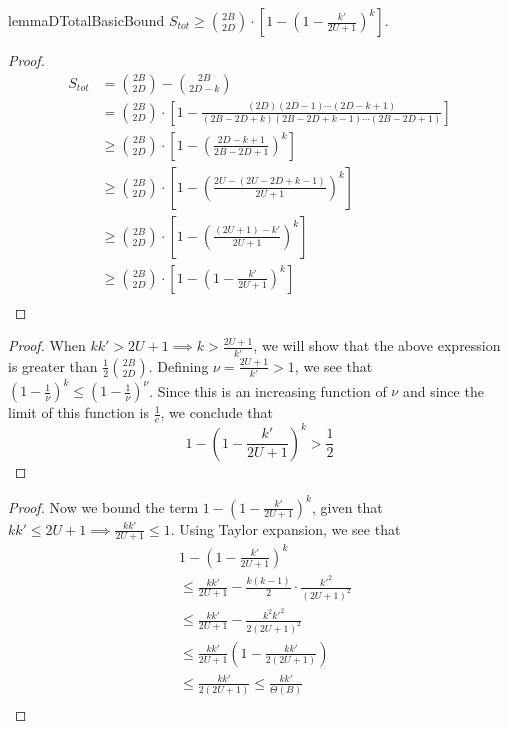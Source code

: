 \begin{restatable}{lemma}{DTotalBasicBound}
\label{lem:DTotalBasicBound}
$S_{tot} \ge {{2B}\choose{2D}}\cdot \left[1-\left(1 - \frac{k'}{2U+1}\right)^k\right]$.
\end{restatable}
\begin{proof}
\begin{align}
S_{tot} &= {{2B}\choose{2D}}-{{2B}\choose{2D-k}}\\
&= {{2B}\choose{2D}}\cdot \left[1-\frac{(2D)(2D-1)\cdots(2D-k+1)}{(2B-2D+k)(2B-2D+k-1)\cdots(2B-2D+1)}\right]\\
&\ge {{2B}\choose{2D}}\cdot \left[1-\left(\frac{2D-k+1}{2B-2D+1}\right)^k\right]\\
&\ge {{2B}\choose{2D}}\cdot \left[1-\left(\frac{2U-(2U-2D+k-1)}{2U+1}\right)^k\right]\\
&\ge {{2B}\choose{2D}}\cdot \left[1-\left(\frac{(2U+1)-k'}{2U+1}\right)^k\right]\\
&\ge {{2B}\choose{2D}}\cdot \left[1-\left(1 - \frac{k'}{2U+1}\right)^k\right]\\
\end{align}
\end{proof}


\DTotalFarBoundary*
\begin{proof}
When $kk' > 2U + 1 \implies k > \frac{2U+1}{k'}$,
we will show that the above expression is greater than $\frac 12 \binom{2B}{2D}$.
Defining $\nu = \frac{2U+1}{k'} > 1$, we see that $(1-\frac 1\nu)^k \le (1-\frac 1\nu)^\nu$.
Since this is an increasing function of $\nu$ and since the limit of this function is $\frac 1e$,
we conclude that
\[
1-\left(1 - \frac{k'}{2U+1}\right)^k > \frac 12
\]
\end{proof}

\DTotalNearBoundary*
\begin{proof}
Now we bound the term $1-\left(1-\frac{k'}{2U+1}\right)^k$, given that $kk'\le 2U+1\implies\frac{kk'}{2U+1} \le 1$.
Using Taylor expansion, we see that
\begin{align}
&1 - \left(1 - \frac{k'}{2U+1}\right)^k\\
&\le \frac{kk'}{2U+1} - \frac{k(k-1)}{2}\cdot\frac{k'^2}{(2U+1)^2}\\
&\le \frac{kk'}{2U+1} - \frac{k^2k'^2}{2(2U+1)^2}\\
&\le \frac{kk'}{2U+1} \left(1 - \frac{kk'}{2(2U+1)}\right)\\
&\le \frac{kk'}{2(2U+1)} \le \frac{kk'}{\Theta(B)}\\
\end{align}
\end{proof}



